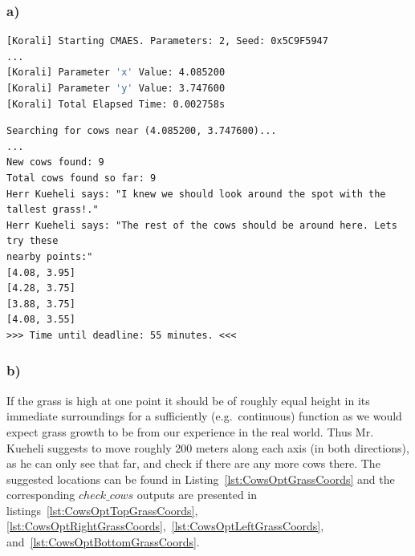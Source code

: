 \documentclass{article}
\begin{document}
    \subsubsection*{a)}
    \label{subsubsec:Task1a}

    \begin{lstlisting}[language=bash, basicstyle=\tiny, frame=single,
    caption={Korali output when determining the optimal x- and y-coordinates
    in terms of grass height.}, label={lst:KoraliOptGrassCoords}]
[Korali] Starting CMAES. Parameters: 2, Seed: 0x5C9F5947
...
[Korali] Parameter 'x' Value: 4.085200
[Korali] Parameter 'y' Value: 3.747600
[Korali] Total Elapsed Time: 0.002758s
    \end{lstlisting}

    \begin{lstlisting}[basicstyle=\tiny, frame=single,
    caption={Terminal output for $check\_cows$ with the optimal x- and
    y-coordinates determined in Listing~\ref{lst:KoraliOptGrassCoords}.},
    label={lst:CowsOptGrassCoords}]
Searching for cows near (4.085200, 3.747600)...
...
New cows found: 9
Total cows found so far: 9
Herr Kueheli says: "I knew we should look around the spot with the tallest grass!."
Herr Kueheli says: "The rest of the cows should be around here. Lets try these
nearby points:"
[4.08, 3.95]
[4.28, 3.75]
[3.88, 3.75]
[4.08, 3.55]
>>> Time until deadline: 55 minutes. <<<
    \end{lstlisting}

    \subsubsection*{b)}
    \label{subsubsec:Task1b}

    If the grass is high at one point it should be of roughly equal height in
    its immediate surroundings for a sufficiently  (e.g.\
    continuous) function as we would expect grass growth to be from our
    experience in the real world.
    Thus Mr. Kueheli suggests to move roughly 200 meters along each axis
    (in both directions), as he can only see that far, and check if there
    are any more cows there.
    The suggested locations can be found in
    Listing~\ref{lst:CowsOptGrassCoords} and the corresponding $check\_cows$
    outputs are presented in listings~\ref{lst:CowsOptTopGrassCoords},
    \ref{lst:CowsOptRightGrassCoords},~\ref{lst:CowsOptLeftGrassCoords},
    and~\ref{lst:CowsOptBottomGrassCoords}.
\end{document}
